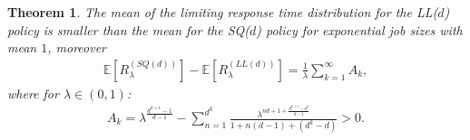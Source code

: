 \documentclass[12pt]{report}
\newcommand{\E}{\mathbb{E}}
\newtheorem{theorem}{Theorem}
\begin{document}
\begin{theorem} \label{th:LLsmallerSQ}
The mean of the limiting response time distribution for the LL($d$) policy is smaller than the
mean for the SQ($d$) policy for exponential job sizes with mean $1$, moreover 
\begin{align*}
\E\left[R^{(SQ(d))}_\lambda\right] - \E\left[R^{(LL(d))}_\lambda\right] = \frac{1}{\lambda}\sum_{k=1}^{\infty} A_k, 
\end{align*}
where for $\lambda \in (0,1)$:
\begin{align*}
A_k = \lambda^{\frac{d^{k+1}-1}{d-1}} - \sum_{n=1}^{d^k} \frac{\lambda^{nd + 1 + \frac{d^{k+1} - d^2}{d-1}}}{1 + n(d-1)+(d^k-d)} > 0.
\end{align*}
\end{theorem}
\end{document}
